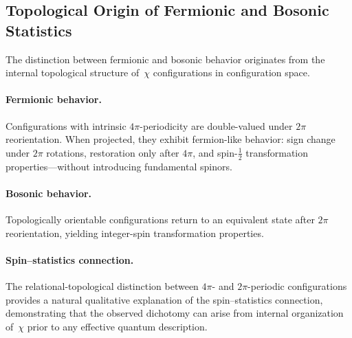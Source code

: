 \subsection{Topological Origin of Fermionic and Bosonic Statistics}
  \label{app:relational_spin_statistics}

  The distinction between fermionic and bosonic behavior originates from
  the internal topological structure of~$\chi$ configurations in
  configuration space.

  \paragraph{Fermionic behavior.}
    Configurations with intrinsic $4\pi$-periodicity are double-valued under
    $2\pi$ reorientation.
    When projected, they exhibit fermion-like behavior: sign change under
    $2\pi$ rotations, restoration only after $4\pi$, and
    spin-$\tfrac{1}{2}$ transformation properties---without introducing
    fundamental spinors.

  \paragraph{Bosonic behavior.}
    Topologically orientable configurations return to an equivalent state
    after $2\pi$ reorientation, yielding integer-spin transformation
    properties.

  \paragraph{Spin--statistics connection.}
    The relational-topological distinction between $4\pi$- and
    $2\pi$-periodic configurations provides a natural qualitative
    explanation of the spin--statistics connection, demonstrating that the
    observed dichotomy can arise from internal organization of~$\chi$ prior
    to any effective quantum description.
